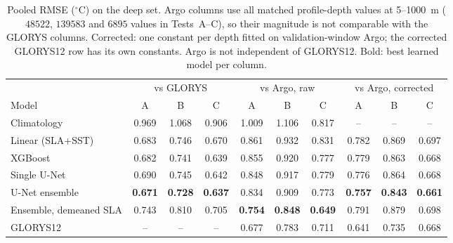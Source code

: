 \begin{table}[t]
\centering
\caption{Pooled RMSE ($^\circ$C) on the deep set. Argo columns use all matched profile-depth values at 5--1000~m ($48522$, $139583$ and $6895$ values in Tests~A--C), so their magnitude is not comparable with the GLORYS columns. Corrected: one constant per depth fitted on validation-window Argo; the corrected GLORYS12 row has its own constants. Argo is not independent of GLORYS12. Bold: best learned model per column.}
\label{tab:main}
\begin{tabular}{@{}lccccccccc@{}}
\hline
 & \multicolumn{3}{c}{vs GLORYS} & \multicolumn{3}{c}{vs Argo, raw} & \multicolumn{3}{c}{vs Argo, corrected} \\
\cline{2-4}\cline{5-7}\cline{8-10}
Model & A & B & C & A & B & C & A & B & C \\
\hline
Climatology & 0.969 & 1.068 & 0.906 & 1.009 & 1.106 & 0.817 & -- & -- & -- \\
Linear (SLA+SST) & 0.683 & 0.746 & 0.670 & 0.861 & 0.932 & 0.831 & 0.782 & 0.869 & 0.697 \\
XGBoost & 0.682 & 0.741 & 0.639 & 0.855 & 0.920 & 0.777 & 0.779 & 0.863 & 0.668 \\
Single U-Net & 0.690 & 0.745 & 0.642 & 0.848 & 0.917 & 0.779 & 0.776 & 0.864 & 0.668 \\
U-Net ensemble & \textbf{0.671} & \textbf{0.728} & \textbf{0.637} & 0.834 & 0.909 & 0.773 & \textbf{0.757} & \textbf{0.843} & \textbf{0.661} \\
Ensemble, demeaned SLA & 0.743 & 0.810 & 0.705 & \textbf{0.754} & \textbf{0.848} & \textbf{0.649} & 0.791 & 0.879 & 0.698 \\
\hline
GLORYS12 & -- & -- & -- & 0.677 & 0.783 & 0.711 & 0.641 & 0.735 & 0.668 \\
\hline
\end{tabular}
\end{table}

